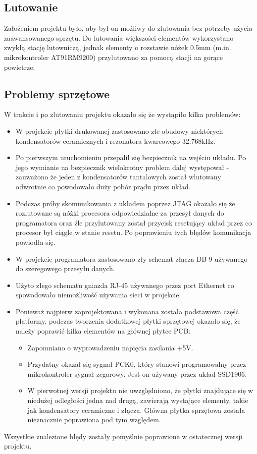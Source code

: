 \documentclass[a4paper,12pt]{book}
\begin{document}
			\subsection{Lutowanie}
				Założeniem projektu było, aby był on możliwy do zlutowania bez potrzeby użycia zaawansowanego sprzętu. Do lutowania większości elementów wykorzystano zwykłą stację lutowniczą, jednak elementy o rozstawie nóżek 0.5mm (m.in. mikrokontroler AT91RM9200) przylutowano za pomocą stacji na gorące powietrze.
			
			\subsection{Problemy sprzętowe}
				W trakcie i po zlutowaniu projektu okazało się że wystąpiło kilka problemów:
				\begin{itemize}
					\item W projekcie płytki drukowanej zastosowano złe obudowy niektórych kondensatorów ceramicznych i rezonatora kwarcowego 32.768kHz.
					\item Po pierwszym uruchomieniu przepalił się bezpiecznik na wejściu układu. Po jego wymianie na bezpiecznik wielokrotny problem dalej występował - zauważono że jeden z kondensatorów tantalowych został wlutowany odwrotnie co powodowało duży pobór prądu przez układ.
					\item Podczas próby skomunikowania z układem poprzez JTAG okazało się że rozlutowane są nóżki procesora odpowiedzialne za przesył danych do programatora oraz źle przylutowany został przycisk resetujący układ przez co procesor był ciągle w stanie resetu. Po poprawieniu tych błędów komunikacja powiodła się.
					\item W projekcie programatora zastosowano zły schemat złącza DB-9 używanego do szeregowego przesyłu danych.
					\item Użyto złego schematu gniazda RJ-45 używanego przez port Ethernet co spowodowało niemożliwość używania sieci w projekcie.
					\item Ponieważ najpierw zaprojektowana i wykonana została podstawowa część platformy, podczas tworzenia dodatkowej płytki sprzętowej okazało się, że należy poprawić kilka elementów na głównej płytce PCB:
						\begin{itemize}
							\item Zapomniano o wyprowadzeniu napięcia zasilania +5V.
							\item Przydatny okazał się sygnał PCK0, który stanowi programowalny przez mikrokontroler sygnał zegarowy. Jest on używany przez układ SSD1906.
							\item W pierwotnej wersji projektu nie uwzględniono, że płytki znajdujące się w niedużej odległości jedna nad drugą, zawierają wystające elementy, takie jak kondensatory ceramiczne i złącza. Główna płytka sprzętowa została nieznacznie poprawiona pod tym względem.
						\end{itemize}
				\end{itemize}
				Wszystkie znalezione błędy zostały pomyślnie poprawione w ostatecznej wersji projektu.
\end{document}
